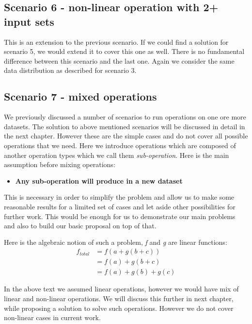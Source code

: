 \subsection{Scenario 6 - non-linear operation with 2+ input sets}
This is an extension to the previous scenario. 
If we could find a solution for scenario 5, we would extend it to cover this one as well. 
There is no fundamental difference between this scenario and the last one. Again we consider the same
data distribution as described for scenario 3.

\subsection{Scenario 7 - mixed operations}
We previously discussed a number of scenarios to run operations on one ore more datasets. The solution to 
above mentioned scenarios will be discussed in detail in the next chapter. However these are the simple cases and
do not cover all possible operations that we need. Here we introduce operations which are composed of another
operation types which we call them \textit{sub-operation}.
Here is the main assumption before mixing operations:

\begin{itemize}
\item \textbf{Any sub-operation will produce in a new dataset}
\end{itemize}

This is necessary in order to simplify the problem and allow us to make some reasonable results
for a limited set of cases and let aside other possibilities for further work. This would be enough
for us to demonstrate our main problems and also to build our basic proposal on top of that.

Here is the algebraic notion of such a problem, \textit{f} and \textit{g} are linear functions:
\begin{subequations}
\begin{align*}
f_{total} &= f(a + g(b + c))\\
&= f(a) + g(b + c)\\
&= f(a) + g(b) + g(c)
\end{align*}
\end{subequations}

In the above text we assumed linear operations, however we would have mix of linear and non-linear operations. 
We will discuss this further in next chapter, 
while proposing a solution to solve such operations. However we do not cover non-linear cases in current work.

